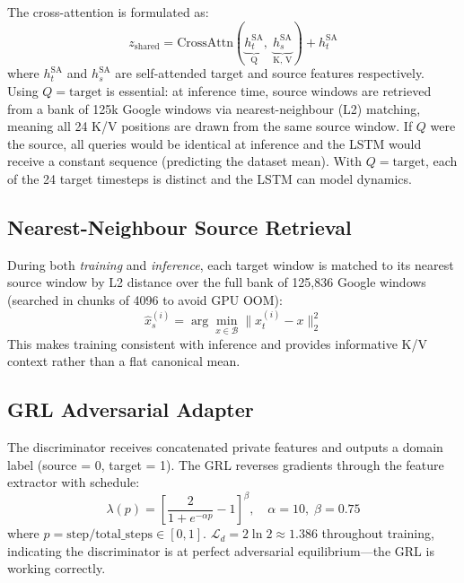 \documentclass[12pt,a4paper]{article}
\begin{document}
The cross-attention is formulated as:
\begin{equation}
    z_{\text{shared}} = \text{CrossAttn}(\underbrace{h_t^{\text{SA}}}_{\text{Q}},\;
                                          \underbrace{h_s^{\text{SA}}}_{\text{K, V}})
    + h_t^{\text{SA}}
\end{equation}
where $h_t^{\text{SA}}$ and $h_s^{\text{SA}}$ are self-attended target and source
features respectively.
Using $Q = \text{target}$ is essential: at inference time, source windows are
retrieved from a bank of 125k Google windows via nearest-neighbour (L2) matching,
meaning all 24 K/V positions are drawn from the same source window.  If $Q$ were
the source, all queries would be identical at inference and the LSTM would receive
a constant sequence (predicting the dataset mean).  With $Q = \text{target}$,
each of the 24 target timesteps is distinct and the LSTM can model dynamics.

\subsection{Nearest-Neighbour Source Retrieval}

During both \emph{training} and \emph{inference}, each target window is matched to
its nearest source window by L2 distance over the full bank of 125,836 Google
windows (searched in chunks of 4096 to avoid GPU OOM):
\begin{equation}
    \hat{x}_s^{(i)} = \arg\min_{x \in \mathcal{B}} \|x_t^{(i)} - x\|_2^2
\end{equation}
This makes training consistent with inference and provides informative K/V context
rather than a flat canonical mean.

\subsection{GRL Adversarial Adapter}

The discriminator receives concatenated private features and outputs a domain label
(source = 0, target = 1).  The GRL reverses gradients through the feature extractor
with schedule:
\begin{equation}
    \lambda(p) = \left[\frac{2}{1 + e^{-\alpha p}} - 1\right]^\beta, \quad
    \alpha = 10,\; \beta = 0.75
\end{equation}
where $p = \text{step} / \text{total\_steps} \in [0, 1]$.
$\mathcal{L}_d = 2\ln 2 \approx 1.386$ throughout training, indicating the
discriminator is at perfect adversarial equilibrium—the GRL is working correctly.
\end{document}
